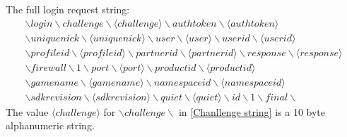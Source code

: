 \documentclass[oneside,titlepage,a4paper]{report} %
\begin{document}
The full login request string:
\begin{equation}\label{Chanllenge string}
\begin{gathered}
	\backslash login \backslash challenge \backslash \langle challenge \rangle \backslash authtoken \backslash \langle authtoken \rangle \\ \backslash uniquenick \backslash \langle uniquenick \rangle \backslash user \backslash \langle user \rangle 
	\backslash userid \backslash \langle userid \rangle \\ \backslash profileid \backslash \langle profileid \rangle \backslash partnerid \backslash \langle partnerid \rangle \backslash response \backslash \langle response \rangle \\
	 \backslash firewall \backslash 1 \backslash port \backslash \langle port \rangle \backslash productid \backslash  \langle productid \rangle \\ \backslash gamename \backslash \langle gamename \rangle \backslash namespaceid \backslash \langle namespaceid \rangle \\ \backslash  sdkrevision \backslash \langle sdkrevision \rangle \backslash quiet \backslash \langle quiet \rangle \backslash id \backslash 1 \backslash final \backslash
\end{gathered}
\end{equation}
The value $ \langle challenge \rangle $ for $ \backslash challenge \backslash $ in \ref{Chanllenge string} is a 10 byte alphanumeric string.
\end{document}
